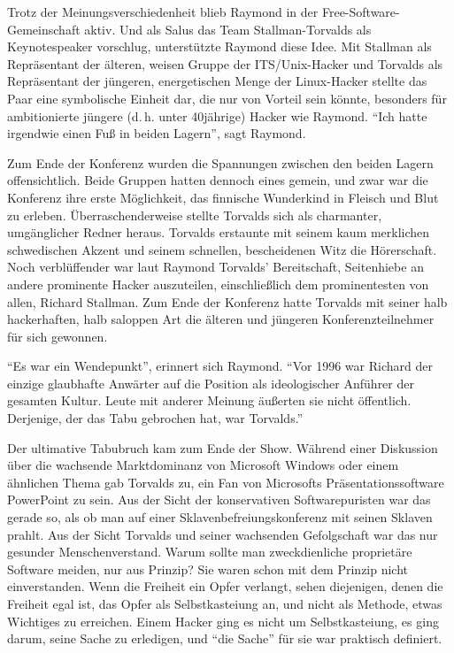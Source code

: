 Trotz der Meinungsverschiedenheit blieb Raymond in der Free-Software-Gemeinschaft aktiv. Und als Salus das Team Stallman-Torvalds als Keynotespeaker vorschlug, unterstützte Raymond diese Idee. Mit Stallman als Repräsentant der älteren, weisen Gruppe der ITS/Unix-Hacker und Torvalds als Repräsentant der jüngeren, energetischen Menge der Linux-Hacker stellte das Paar eine symbolische Einheit dar, die nur von Vorteil sein könnte, besonders für ambitionierte jüngere (d.\,h. unter 40jährige) Hacker wie Raymond. "`Ich hatte irgendwie einen Fuß in beiden Lagern"', sagt Raymond.

Zum Ende der Konferenz wurden die Spannungen zwischen den beiden Lagern offensichtlich. Beide Gruppen hatten dennoch eines gemein, und zwar war die Konferenz ihre erste Möglichkeit, das finnische Wunderkind in Fleisch und Blut zu erleben. Überraschenderweise stellte Torvalds sich als charmanter, umgänglicher Redner heraus. Torvalds erstaunte mit seinem kaum merklichen schwedischen Akzent und seinem schnellen, bescheidenen Witz die Hörerschaft.\footnotemark{}
Noch verblüffender war laut Raymond Torvalds' Bereitschaft, Seitenhiebe an andere prominente Hacker auszuteilen, einschließlich dem prominentesten von allen, Richard Stallman. Zum Ende der Konferenz hatte Torvalds mit seiner halb hackerhaften, halb saloppen Art die älteren und jüngeren Konferenzteilnehmer für sich gewonnen.


"`Es war ein Wendepunkt"', erinnert sich Raymond. "`Vor 1996 war Richard der einzige glaubhafte Anwärter auf die Position als ideologischer Anführer der gesamten Kultur. Leute mit anderer Meinung äußerten sie nicht öffentlich. Derjenige, der das Tabu gebrochen hat, war Torvalds."'

Der ultimative Tabubruch kam zum Ende der Show. Während einer Diskussion über die wachsende Marktdominanz von Microsoft Windows oder einem ähnlichen Thema gab Torvalds zu, ein Fan von Microsofts Präsentationssoftware PowerPoint zu sein. Aus der Sicht der konservativen Softwarepuristen war das gerade so, als ob man auf einer Sklavenbefreiungskonferenz mit seinen Sklaven prahlt. Aus der Sicht Torvalds und seiner wachsenden Gefolgschaft war das nur gesunder Menschenverstand. Warum sollte man zweckdienliche proprietäre Software meiden, nur aus Prinzip? Sie waren schon mit dem Prinzip nicht einverstanden. Wenn die Freiheit ein Opfer verlangt, sehen diejenigen, denen die Freiheit egal ist, das Opfer als Selbstkasteiung an, und nicht als Methode, etwas Wichtiges zu erreichen. Einem Hacker ging es nicht um Selbstkasteiung, es ging darum, seine Sache zu erledigen, und "`die Sache"' für sie war praktisch definiert.

